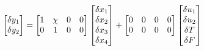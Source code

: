 \begin{align*}
    \begin{bmatrix} \delta y_1 \\ \delta y_2 \end{bmatrix} = \begin{bmatrix} 1 & \chi & 0 & 0 \\
                                 0 & 1       & 0 & 0 \end{bmatrix}
                            \begin{bmatrix} \delta x_1 \\ \delta x_2 \\ \delta x_3 \\ \delta x_4 \end{bmatrix} +
                            \begin{bmatrix} 0 & 0 & 0 & 0\\
                                0 & 0 & 0 & 0
                                 \end{bmatrix}
                            \begin{bmatrix} \delta u_1 \\ \delta u_2 \\ \delta T \\ \delta F \end{bmatrix}
\end{align*}
